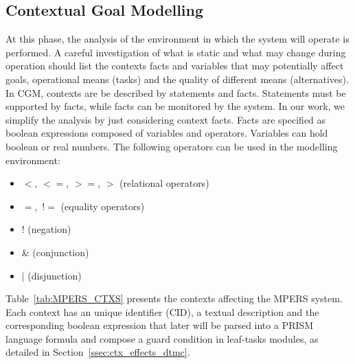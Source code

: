 \subsection{Contextual Goal Modelling}

At this phase, the analysis of the environment in which the system will operate is performed. A careful investigation of what is static and what may change during operation should list the contexts facts and variables that may potentially affect goals, operational means (tasks) and the quality of different means (alternatives). In CGM, contexts are be described by statements and facts. Statements must be supported by facts, while facts can be monitored by the system. In our work, we simplify the analysis by just considering context facts. Facts are specified as boolean expressions composed of variables and operators. Variables can hold boolean or real numbers. The following operators can be used in the modelling environment:

\begin{itemize}

\item $<$, $<=$, $>=$, $>$ (relational operators)
\item $=$,\ $!=$ (equality operators)
\item $!$ (negation)
\item $\&$ (conjunction)
\item $|$ (disjunction)

\end{itemize} 

Table~\ref{tab:MPERS_CTXS} presents the contexts affecting the MPERS system. Each context has an unique identifier (CID), a textual description and the corresponding boolean expression that later will be parsed into a PRISM language formula and compose a guard condition in leaf-tasks modules, as detailed in Section~\ref{ssec:ctx_effects_dtmc}.

